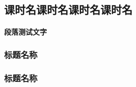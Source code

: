 \documentclass[color=BLUE]{textbook-cn}%
\begin{document}
\begin{Paracol}
\Example{\lipsum[1][1-5]}
\Answer{\lipsum[1][1-5]}




\begin{Method}
\lipsum[1][1-8]
\end{Method}



\Example{\zhlipsum[1]}
\Answer{\lipsum[1][1-5]}
\Answer*{\lipsum[1][1-5]}

\Variety{\lipsum[1][1-5]}
\Answer{\lipsum[1][1-5]}





\begin{Mind}[控制变量]
\lipsum[2]
\end{Mind}




\begin{Display}[向心力]
\lipsum[2]
\lipsum[2]\lipsum[2][1-2]
\end{Display}


\begin{Application}
\lipsum[2]
\lipsum[2]
\end{Application}

\subsection{课时名课时名课时名课时名}
\paragraph{段落测试文字}
\lipsum[3]

\subsubsection{标题名称}
\lipsum[1]

\begin{History}
\lipsum[1-2]
\end{History}


\begin{STS}
\lipsum[1-2]
\end{STS}



\begin{Information}
\lipsum[2]
\end{Information}


\subsubsection{标题名称}


\lipsum[1]

\end{Paracol}
\end{document}
